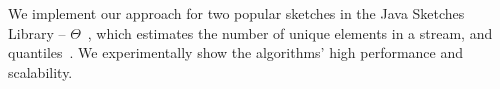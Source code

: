 We implement our approach for two popular sketches in the Java Sketches Library -- $\Theta$~\cite{Theta},
which estimates the number of unique elements in a stream, and quantiles~\cite{quantiles}.
We experimentally show the algorithms' high performance and scalability. 
  

 
